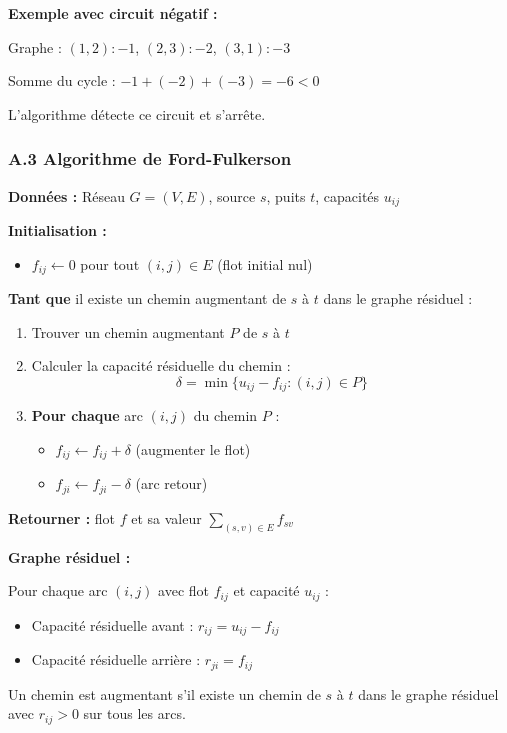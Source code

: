 \documentclass[12pt,a4paper]{article}
\begin{document}
\begin{exemple}
\textbf{Exemple avec circuit négatif :}

Graphe : $(1,2): -1$, $(2,3): -2$, $(3,1): -3$

Somme du cycle : $-1 + (-2) + (-3) = -6 < 0$

L'algorithme détecte ce circuit et s'arrête.
\end{exemple}

\newpage
\subsubsection*{A.3 Algorithme de Ford-Fulkerson}

\begin{algorithme}
\textbf{Données :} Réseau $G = (V, E)$, source $s$, puits $t$, capacités $u_{ij}$

\textbf{Initialisation :}
\begin{itemize}
    \item $f_{ij} \leftarrow 0$ pour tout $(i,j) \in E$ (flot initial nul)
\end{itemize}

\textbf{Tant que} il existe un chemin augmentant de $s$ à $t$ dans le graphe résiduel :
\begin{enumerate}
    \item Trouver un chemin augmentant $P$ de $s$ à $t$
    \item Calculer la capacité résiduelle du chemin :
    $$\delta = \min\{u_{ij} - f_{ij} : (i,j) \in P\}$$
    \item \textbf{Pour chaque} arc $(i,j)$ du chemin $P$ :
    \begin{itemize}
        \item $f_{ij} \leftarrow f_{ij} + \delta$ (augmenter le flot)
        \item $f_{ji} \leftarrow f_{ji} - \delta$ (arc retour)
    \end{itemize}
\end{enumerate}

\textbf{Retourner :} flot $f$ et sa valeur $\sum_{(s,v) \in E} f_{sv}$
\end{algorithme}

\begin{notecours}
\textbf{Graphe résiduel :}

Pour chaque arc $(i,j)$ avec flot $f_{ij}$ et capacité $u_{ij}$ :
\begin{itemize}
    \item Capacité résiduelle avant : $r_{ij} = u_{ij} - f_{ij}$
    \item Capacité résiduelle arrière : $r_{ji} = f_{ij}$
\end{itemize}

Un chemin est augmentant s'il existe un chemin de $s$ à $t$ dans le graphe résiduel avec $r_{ij} > 0$ sur tous les arcs.
\end{notecours}
\end{document}
